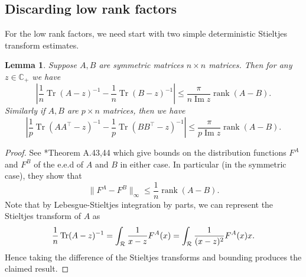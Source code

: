 \documentclass[letterpaper, 10pt, dvipsnames]{article}
\numberwithin{equation}{section}
\renewcommand{\Im}{\operatorname{Im}}
\DeclareMathOperator{\Tr}{Tr}
\newcommand{\tr}{\Tr}
\newcommand{\C}{\mathbb{C}}
\let\d\relax
\newcommand{\d}{\mathrm{d}}
\newcommand{\R}{\mathcal{R}}
\newtheorem{lem}[ccounter]{Lemma}
\theoremstyle{definition}
\begin{document}
\subsection*{Discarding low rank factors}

For the low rank factors, we need start with two simple deterministic Stieltjes transform estimates.
\begin{lem}\label{lem:stieltjes}
  Suppose $A,B$ are symmetric matrices $n \times n$ matrices.  Then for any $z \in \C_+$ we have 
  \[
  \left|\frac{1}{n}\tr(A-z)^{-1} - \frac{1}{n}\tr(B-z)^{-1}\right| 
  \leq  \frac{\pi}{n \Im z} \operatorname{rank}(A-B).
  \]
  Similarly if $A,B$ are $p \times n$ matrices, then we have 
  \[
  \left|\frac{1}{p}\tr(AA^{\top}-z)^{-1} - \frac{1}{p}\tr(BB^{\top}-z)^{-1}\right| 
  \leq  \frac{\pi}{p \Im z} \operatorname{rank}(A-B).
  \]
\end{lem}
\begin{proof}
  See \cite{baisilverstein}*{Theorem A.43,44} which give bounds on the distribution functions $F^A$ and $F^B$ of the e.e.d of $A$ and $B$ in either case.  In particular (in the symmetric case), they show that 
  \[
  \| F^A - F^B \|_\infty \leq \frac{1}{n} \operatorname{rank}(A-B).
  \]
  Note that by Lebesgue-Stieltjes integration by parts, we can represent the Stieltjes transform of $A$ as 
  \[
  \frac{1}{n}\tr(A-z)^{-1} = \int_\R \frac{1}{x-z} \d F^A(x) = \int_\R \frac{1}{(x-z)^2} F^A(x) \d x.
  \]
  Hence taking the difference of the Stieltjes transforms and bounding produces the claimed result.
\end{proof}
\end{document}
